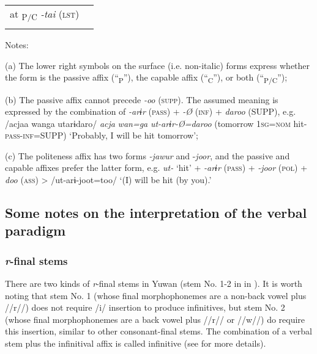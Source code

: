 \begin{table}
\begin{tabular}{ll}
    at\textsubscript{ P/C}  \textit{-tai} (\textsc{lst})                                                                                                                                                                                                                                                                                                                                                                                                                                                                        \\
\lspbottomrule
\end{tabular}
Notes:

(a) The lower right symbols on the surface (i.e. non-italic) forms express whether the form is the passive affix (“\textsubscript{P}”), the capable affix (“\textsubscript{C}”), or both (“\textsubscript{P/C}”);

(b) The passive affix cannot precede \textit{-oo} (\textsc{supp}). The assumed meaning is expressed by the combination of \textit{-arɨr} (\textsc{pass}) + \textit{-Ø} (\textsc{inf}) + \textit{daroo} (SUPP), e.g. /acjaa wanga utarɨdaro/ \textit{acja} \textit{wan=ga} \textit{ut-arɨr-Ø=daroo} (tomorrow 1\textsc{sg}=\textsc{nom} hit-\textsc{pass}-\textsc{inf}=SUPP) ‘Probably, I will be hit tomorrow’;

(c) The politeness affix has two forms \textit{-jawur} and -\textit{joor}, and the passive and capable affixes prefer the latter form, e.g. \textit{ut-} ‘hit’ + \textit{-arɨr} (\textsc{pass}) + \textit{-joor} (\textsc{pol}) + \textit{doo} (\textsc{ass}) > /ut-arɨ-joot=too/ ‘(I) will be hit (by you).’\\
\end{table}

\subsection{Some notes on the interpretation of the verbal paradigm}
\subsubsection{\textit{r}-final stems}

There are two kinds of \textit{r}-final stems in Yuwan (stem No. 1-2 in  in ). It is worth noting that stem No. 1 (whose final morphophonemes are a non-back vowel plus //r//) does not require /i/ insertion to produce infinitives, but stem No. 2 (whose final morphophonemes are a back vowel plus //r// or //w//) do require this insertion, similar to other consonant-final stems. The combination of a verbal stem plus the infinitival affix is called infinitive (see  for more details).

